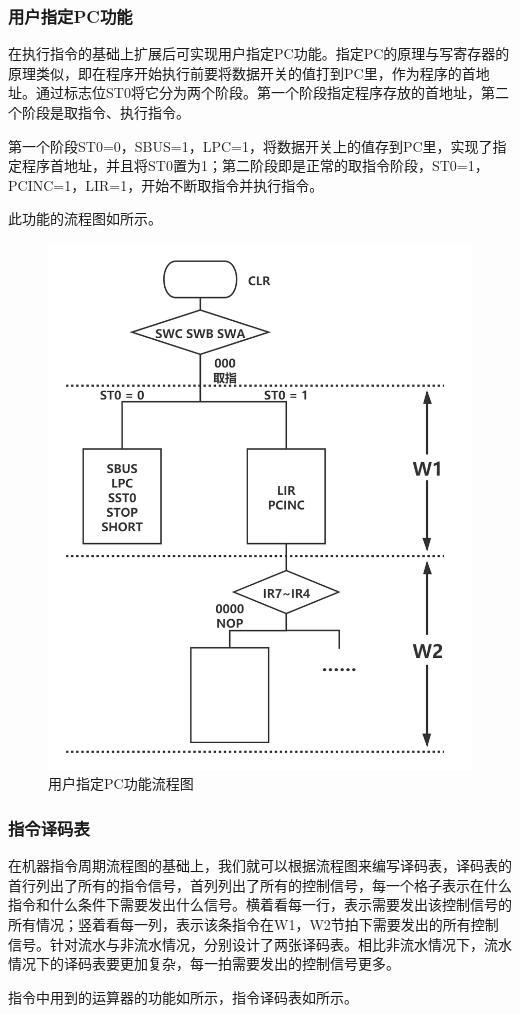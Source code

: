 \documentclass[lang=cn,11pt,a4paper,cite=authornum]{paper}
\begin{document}
\subsubsection{用户指定PC功能}

在执行指令的基础上扩展后可实现用户指定PC功能。指定PC的原理与写寄存器的原理类似，即在程序开始执行前要将数据开关的值打到PC里，作为程序的首地址。通过标志位ST0将它分为两个阶段。第一个阶段指定程序存放的首地址，第二个阶段是取指令、执行指令。

第一个阶段ST0=0，SBUS=1，LPC=1，将数据开关上的值存到PC里，实现了指定程序首地址，并且将ST0置为1；第二阶段即是正常的取指令阶段，ST0=1，PCINC=1，LIR=1，开始不断取指令并执行指令。

此功能的流程图如所示。

\begin{figure}[htbp]
    \centering
    \includegraphics[width=0.5\linewidth]{./Images/nopipe-pc.png}
    \caption{用户指定PC功能流程图\label{fig:nopipe-pc}}
\end{figure}

\subsubsection{指令译码表}


在机器指令周期流程图的基础上，我们就可以根据流程图来编写译码表，译码表的首行列出了所有的指令信号，首列列出了所有的控制信号，每一个格子表示在什么指令和什么条件下需要发出什么信号。横着看每一行，表示需要发出该控制信号的所有情况；竖着看每一列，表示该条指令在W1，W2节拍下需要发出的所有控制信号。针对流水与非流水情况，分别设计了两张译码表。相比非流水情况下，流水情况下的译码表要更加复杂，每一拍需要发出的控制信号更多。

指令中用到的运算器的功能如所示，指令译码表如所示。
\end{document}
